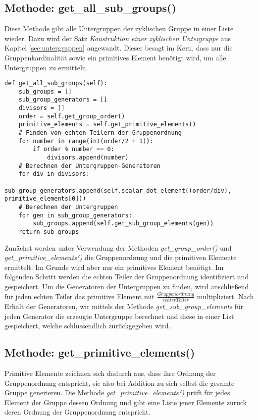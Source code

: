 \subsection{Methode: get\_all\_sub\_groups()}
Diese Methode gibt alle Untergruppen der zyklischen Gruppe in einer Liste wieder. Dazu wird der Satz \textit{Konstruktion einer zyklischen Untergruppe} aus Kapitel \ref{sec:untergruppen} angewandt. Dieser besagt im Kern, dass nur die Gruppenkardinalität sowie ein primitives Element benötigt wird, um alle Untergruppen zu ermitteln.
\vspace{\baselineskip}
\begin{lstlisting}[caption={Methode: get\_all\_sub\_groups()}, captionpos=b]
def get_all_sub_groups(self):
    sub_groups = []
    sub_group_generators = []
    divisors = []
    order = self.get_group_order()
    primitive_elements = self.get_primitive_elements()
    # Finden von echten Teilern der Gruppenordnung
    for number in range(int(order/2 + 1)):
        if order % number == 0:
            divisors.append(number)
    # Berechnen der Untergruppen-Generatoren
    for div in divisors:
        sub_group_generators.append(self.scalar_dot_element((order/div), primitive_elements[0]))
    # Berechnen der Untergruppen
    for gen in sub_group_generators:
        sub_groups.append(self.get_sub_group_elements(gen))
    return sub_groups
\end{lstlisting}
\vspace{\baselineskip}
Zunächst werden unter Verwendung der Methoden \textit{get\_group\_order()} und \textit{get\_primitive\_elements()} die Gruppenordnung und die primitiven Elemente ermittelt. Im Grunde wird aber nur ein primitives Element benötigt. Im folgenden Schritt werden die echten Teiler der Gruppenordnung identifiziert und gespeichert. Um die Generatoren der Untergruppen zu finden, wird anschließend für jeden echten Teiler das primitive Element mit  $\frac{Gruppenordnung}{echter Teiler}$ multipliziert. Nach Erhalt der Generatoren, wir mittels der Methode \textit{get\_sub\_group\_elements} für jeden Generator die erzeugte Untergruppe berechnet und diese in einer List gespeichert, welche schlussendlich zurückgegeben wird. 
\subsection{Methode: get\_primitive\_elements()}
Primitive Elemente zeichnen sich dadurch aus, dass ihre Ordnung der Gruppenordnung entspricht, sie also bei Addition zu sich selbst die gesamte Gruppe generieren. Die Methode \textit{get\_primitive\_elements()} prüft für jedes Element der Gruppe dessen Ordnung und gibt eine Liste jener Elemente zurück deren Ordnung der Gruppenordnung entspricht.

